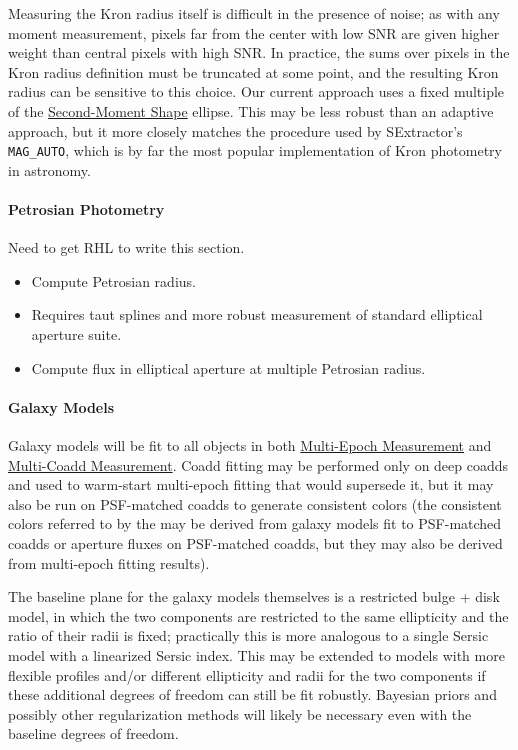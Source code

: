 Measuring the Kron radius itself is difficult in the presence of noise; as with any moment measurement, pixels far from the center with low SNR are given higher weight than central pixels with high SNR.  In practice, the sums over pixels in the Kron radius definition must be truncated at some point, and the resulting Kron radius can be sensitive to this choice.  Our current approach uses a fixed multiple of the \hyperref[sec:acShapeAlgorithms]{Second-Moment Shape} ellipse.  This may be less robust than an adaptive approach, but it more closely matches the procedure used by SExtractor's \texttt{MAG\_AUTO}, which is by far the most popular implementation of Kron photometry in astronomy.


\paragraph{Petrosian Photometry}
\label{sec:acPetrosianPhotometry}

\begin{note}
Need to get RHL to write this section.
\end{note}

\begin{itemize}
\item Compute Petrosian radius.
\item Requires taut splines and more robust measurement of standard elliptical aperture suite.
\item Compute flux in elliptical aperture at multiple Petrosian radius.
\end{itemize}


\paragraph{Galaxy Models}
\label{sec:acGalaxyModels}

Galaxy models will be fit to all objects in both \hyperref[sec:acMultiEpochMeasurement]{Multi-Epoch Measurement} and \hyperref[sec:acMultiCoaddMeasurement]{Multi-Coadd Measurement}.  Coadd fitting may be performed only on deep coadds and used to warm-start multi-epoch fitting that would supersede it, but it may also be run on PSF-matched coadds to generate consistent colors (the consistent colors referred to by the \DPDD{} may be derived from galaxy models fit to PSF-matched coadds or aperture fluxes on PSF-matched coadds, but they may also be derived from multi-epoch fitting results).

The baseline plane for the galaxy models themselves is a restricted bulge + disk model, in which the two components are restricted to the same ellipticity and the ratio of their radii is fixed; practically this is more analogous to a single Sersic model with a linearized Sersic index.  This may be extended to models with more flexible profiles and/or different ellipticity and radii for the two components if these additional degrees of freedom can still be fit robustly.  Bayesian priors and possibly other regularization methods will likely be necessary even with the baseline degrees of freedom.

